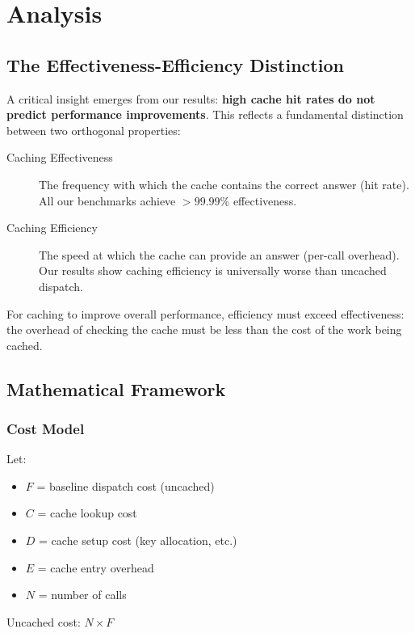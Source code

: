 \documentclass[sigplan,final]{acmart}
\begin{document}
\section{Analysis}

\subsection{The Effectiveness-Efficiency Distinction}

A critical insight emerges from our results: \textbf{high cache hit rates do not predict
performance improvements}. This reflects a fundamental distinction between two orthogonal
properties:

\begin{description}
  \item[Caching Effectiveness] The frequency with which the cache contains the correct answer
    (hit rate). All our benchmarks achieve $>99.99\%$ effectiveness.

  \item[Caching Efficiency] The speed at which the cache can provide an answer (per-call overhead).
    Our results show caching efficiency is universally worse than uncached dispatch.
\end{description}

For caching to improve overall performance, efficiency must exceed effectiveness: the overhead
of checking the cache must be less than the cost of the work being cached.

\subsection{Mathematical Framework}

\subsubsection{Cost Model}

Let:
\begin{itemize}
  \item $F$ = baseline dispatch cost (uncached)
  \item $C$ = cache lookup cost
  \item $D$ = cache setup cost (key allocation, etc.)
  \item $E$ = cache entry overhead
  \item $N$ = number of calls
\end{itemize}

Uncached cost: $N \times F$
\end{document}
